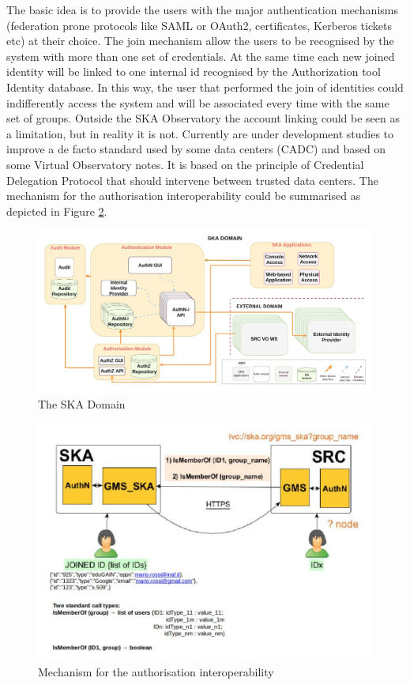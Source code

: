 \documentclass[fleqn,10pt]{wlscirep}
\begin{document}
{The basic idea is to provide the users with the major authentication mechanisms (federation prone protocols like SAML or OAuth2, certificates, Kerberos tickets etc) at their choice. The join mechanism allow the users to be recognised by the system with more than one set of credentials. At the same time each new joined identity will be linked to one internal id recognised by the Authorization tool Identity database. In this way, the user that performed the join of identities could indifferently access the system and will be associated every time with the same set of groups. Outside the SKA Observatory the account linking could be seen as a limitation, but in reality it is not. Currently are under development studies to improve a de facto standard used by some data centers (CADC) and based on some Virtual Observatory notes. It is based on the principle of Credential Delegation Protocol that should intervene between trusted data centers. The mechanism for the authorisation interoperability could be summarised as depicted in Figure \ref{fig:ska-auth}.

\begin{figure}[ht!]
  \centering
  \includegraphics[width=0.7\columnwidth]{ska-domain.png}
  \caption{The SKA Domain}
  \label{fig:ska-domain}
\end{figure}

\begin{figure}[ht!]
  \centering
  \includegraphics[width=0.7\columnwidth]{ska-auth.png}
  \caption{Mechanism for the authorisation interoperability}
  \label{fig:ska-auth}
\end{figure}

}
\end{document}
